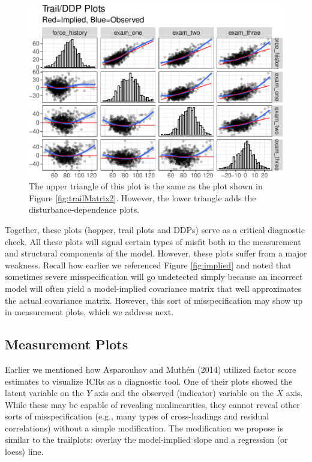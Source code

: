 \documentclass[
  english,
  man]{apa6}
\begin{document}
\begin{figure}

{\centering \includegraphics[width=0.9\linewidth]{flexplavaan_draft_files/figure-latex/ddp-1} 

}

\caption{The upper triangle of this plot is the same as the plot shown in Figure \ref{fig:trailMatrix2}. However, the lower triangle adds the disturbance-dependence plots.}\label{fig:ddp}
\end{figure}

Together, these plots (hopper, trail plots and DDPs) serve as a critical diagnostic check. All these plots will signal certain types of misfit both in the measurement and structural components of the model. However, these plots suffer from a major weakness. Recall how earlier we referenced Figure \ref{fig:implied} and noted that sometimes severe misspecification will go undetected simply because an incorrect model will often yield a model-implied covariance matrix that well approximates the actual covariance matrix. However, this sort of misspecification may show up in measurement plots, which we address next.

\hypertarget{measurement-plots}{%
\subsection{Measurement Plots}\label{measurement-plots}}

Earlier we mentioned how Asparouhov and Muthén (2014) utilized factor score estimates to visualize ICRs as a diagnostic tool. One of their plots showed the latent variable on the \(Y\) axis and the observed (indicator) variable on the \(X\) axis. While these may be capable of revealing nonlinearities, they cannot reveal other sorts of misspecification (e.g., many types of cross-loadings and residual correlations) without a simple modification. The modification we propose is similar to the trailplots: overlay the model-implied slope and a regression (or loess) line.
\end{document}

